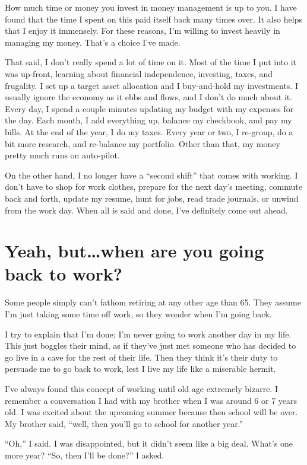 How much time or money you invest in money management is up to you. I have found that the time I spent on this paid itself back many times over. It also helps that I enjoy it immensely. For these reasons, I'm willing to invest heavily in managing my money. That's a choice I've made.

That said, I don't really spend a lot of time on it. Most of the time I put into it was up-front, learning about financial independence, investing, taxes, and frugality. I set up a target asset allocation and I buy-and-hold my investments. I usually ignore the economy as it ebbs and flows, and I don't do much about it. Every day, I spend a couple minutes updating my budget with my expenses for the day. Each month, I add everything up, balance my checkbook, and pay my bills. At the end of the year, I do my taxes. Every year or two, I re-group, do a bit more research, and re-balance my portfolio. Other than that, my money pretty much runs on auto-pilot.

On the other hand, I no longer have a ``second shift'' that comes with working. I don't have to shop for work clothes, prepare for the next day's meeting, commute back and forth, update my resume, hunt for jobs, read trade journals, or unwind from the work day. When all is said and done, I've definitely come out ahead.

\section{Yeah, but\ldots when are you going back to work?}
Some people simply can't fathom retiring at any other age than 65. They assume I'm just taking some time off work, so they wonder when I'm going back.

I try to explain that I'm done; I'm never going to work another day in my life. This just boggles their mind, as if they've just met someone who has decided to go live in a cave for the rest of their life. Then they think it's their duty to persuade me to go back to work, lest I live my life like a miserable hermit.

I've always found this concept of working until old age extremely bizarre. I remember a conversation I had with my brother when I was around 6 or 7 years old. I was excited about the upcoming summer because then school will be over. My brother said, ``well, then you'll go to school for another year.''

``Oh,'' I said. I was disappointed, but it didn't seem like a big deal. What's one more year? ``So, then I'll be done?'' I asked.

